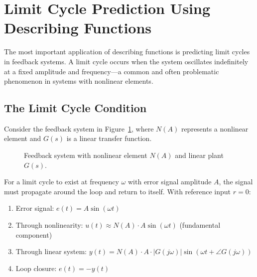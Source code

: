 \section{Limit Cycle Prediction Using Describing Functions}
\label{sec:limit_cycle_prediction}

The most important application of describing functions is predicting limit cycles in feedback systems. A limit cycle occurs when the system oscillates indefinitely at a fixed amplitude and frequency---a common and often problematic phenomenon in systems with nonlinear elements.

\subsection{The Limit Cycle Condition}

Consider the feedback system in Figure~\ref{fig:df_feedback}, where $N(A)$ represents a nonlinear element and $G(s)$ is a linear transfer function.

\begin{figure}[htbp]
\centering
{}
\caption{Feedback system with nonlinear element $N(A)$ and linear plant $G(s)$.}
\label{fig:df_feedback}
\end{figure}

For a limit cycle to exist at frequency $\omega$ with error signal amplitude $A$, the signal must propagate around the loop and return to itself. With reference input $r = 0$:

\begin{enumerate}
    \item Error signal: $e(t) = A\sin(\omega t)$
    \item Through nonlinearity: $u(t) \approx N(A) \cdot A\sin(\omega t)$ (fundamental component)
    \item Through linear system: $y(t) = N(A) \cdot A \cdot |G(j\omega)|\sin(\omega t + \angle G(j\omega))$
    \item Loop closure: $e(t) = -y(t)$
\end{enumerate}

